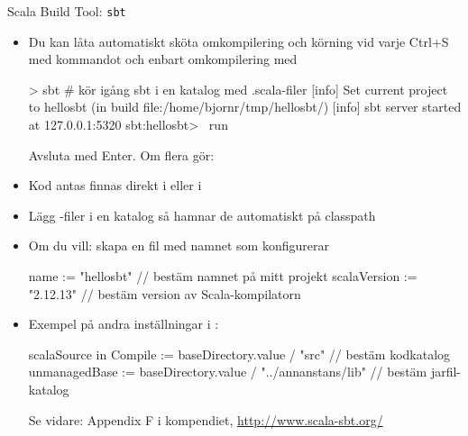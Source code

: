 
\begin{Slide}{Scala Build Tool: \texttt{sbt}}\SlideFontSmall
\begin{itemize}
\item Du kan låta  automatiskt sköta omkompilering och körning vid varje Ctrl+S med kommandot 
och enbart omkompilering med 
\begin{REPL}
> sbt              # kör igång sbt i en katalog med .scala-filer
[info] Set current project to hellosbt (in build file:/home/bjornr/tmp/hellosbt/)
[info] sbt server started at 127.0.0.1:5320
sbt:hellosbt> ~run
\end{REPL}
Avsluta med Enter. Om flera  gör: 
\item Kod antas finnas direkt i  eller i 
\item Lägg -filer i en katalog  så hamnar de automatiskt på classpath
\item Om du vill: skapa en fil med namnet  som konfigurerar 
\begin{Code}
name := "hellosbt"           // bestäm namnet på mitt projekt
scalaVersion := "2.12.13"    // bestäm version av Scala-kompilatorn
\end{Code}
\item Exempel på andra inställningar i :
\begin{CodeSmall}
scalaSource in Compile := baseDirectory.value / "src"      // bestäm kodkatalog
unmanagedBase := baseDirectory.value / "../annanstans/lib" // bestäm jarfil-katalog
\end{CodeSmall}
Se vidare: Appendix F i kompendiet, \url{http://www.scala-sbt.org/}
\end{itemize}
\end{Slide}
